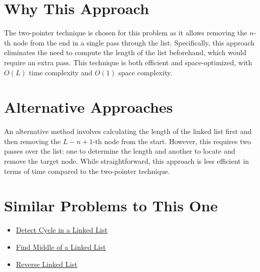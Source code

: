 \section*{Why This Approach}
The two-pointer technique is chosen for this problem as it allows removing the \(n\)-th node from the end in a single pass through the list. Specifically, this approach eliminates the need to compute the length of the list beforehand, which would require an extra pass. This technique is both efficient and space-optimized, with \(O(L)\) time complexity and \(O(1)\) space complexity.

\section*{Alternative Approaches}
An alternative method involves calculating the length of the linked list first and then removing the \(L - n + 1\)-th node from the start. However, this requires two passes over the list: one to determine the length and another to locate and remove the target node. While straightforward, this approach is less efficient in terms of time compared to the two-pointer technique.

\section*{Similar Problems to This One}
\begin{itemize}
    \item \hyperref[problem:detect_cycle]{Detect Cycle in a Linked List}
    \item \hyperref[problem:find_middle_of_linked_list]{Find Middle of a Linked List}
    \item \hyperref[problem:reverse_linked_list]{Reverse Linked List}
\end{itemize}

